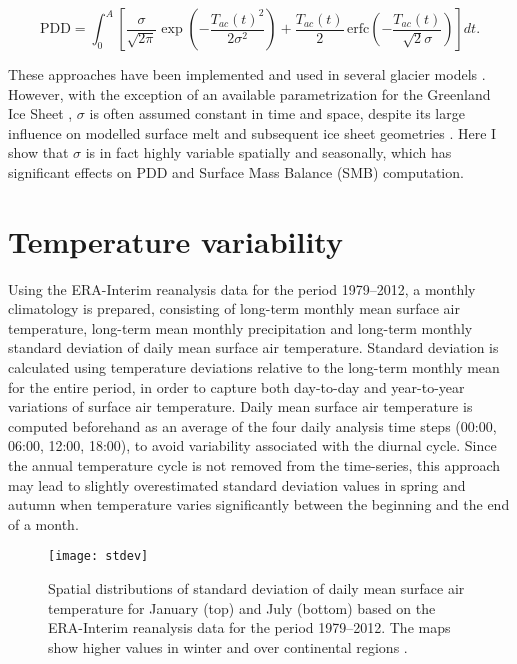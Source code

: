 \documentclass[review]{igs}
\begin{document}
\begin{equation} \label{eq:calovgreve}
  \mathrm{PDD} = \int_{0}^{A} \left[
    \frac{\sigma}{\sqrt{2\pi}}
    \exp\left({-\frac{T_{ac}(t)^2}{2\sigma^2}}\right)
    +\frac{T_{ac}(t)}{2} \,
    \mathrm{erfc} \left(-\frac{T_{ac}(t)}{\sqrt{2}\sigma}\right)
  \right]dt.
\end{equation}

These approaches have been implemented and used in several glacier models \citep[e.g.][]{letreguilly-etal-1991,greve-1997,huybrechts-dewolde-1999,seddik-etal-2012,charbit-etal-2013}. However, with the exception of an available parametrization for the Greenland Ice Sheet \citep{fausto-etal-2011}, $\sigma$ is often assumed constant in time and space, despite its large influence on modelled surface melt and subsequent ice sheet geometries \citep{charbit-etal-2013}. Here I show that $\sigma$ is in fact highly variable spatially and seasonally, which has significant effects on PDD and Surface Mass Balance (SMB) computation.


\section{Temperature variability}

Using the ERA-Interim reanalysis data \citep{data:erai} for the period 1979--2012, a monthly climatology is prepared, consisting of long-term monthly mean surface air temperature, long-term mean monthly precipitation and long-term monthly standard deviation of daily mean surface air temperature. Standard deviation is calculated using temperature deviations relative to the long-term monthly mean for the entire period, in order to capture both day-to-day and year-to-year variations of surface air temperature. Daily mean surface air temperature is computed beforehand as an average of the four daily analysis time steps (00:00, 06:00, 12:00, 18:00), to avoid variability associated with the diurnal cycle. Since the annual temperature cycle is not removed from the time-series, this approach may lead to slightly overestimated standard deviation values in spring and autumn when temperature varies significantly between the beginning and the end of a month. 

\begin{figure}
  \centering\texttt{[image: stdev]}
  \caption{Spatial distributions of standard deviation of daily mean surface air temperature for January (top) and July (bottom) based on the ERA-Interim reanalysis data for the period 1979--2012. The maps show higher values in winter and over continental regions \citep{data:erai}.}
  \label{fig:stdev}
\end{figure}
\end{document}
